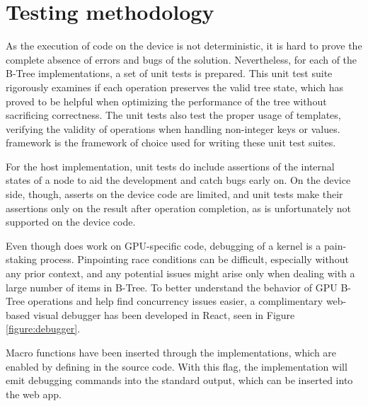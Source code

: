 \section{Testing methodology}

As the execution of code on the device is not deterministic, it is hard to prove the complete absence of errors and bugs of the solution. Nevertheless, for each of the B-Tree implementations, a set of unit tests is prepared. This unit test suite rigorously examines if each operation preserves the valid tree state, which has proved to be helpful when optimizing the performance of the tree without sacrificing correctness. The unit tests also test the proper usage of templates, verifying the validity of operations when handling non-integer keys or values.  framework \cite{gtest} is the framework of choice used for writing these unit test suites.

For the host implementation, unit tests do include assertions of the internal states of a node to aid the development and catch bugs early on. On the device side, though, asserts on the device code are limited, and unit tests make their assertions only on the result after operation completion, as  is unfortunately not supported on the device code.

Even though  does work on GPU-specific code, debugging of a kernel is a pain-staking process. Pinpointing race conditions can be difficult, especially without any prior context, and any potential issues might arise only when dealing with a large number of items in B-Tree. To better understand the behavior of GPU B-Tree operations and help find concurrency issues easier, a complimentary web-based visual debugger has been developed in React, seen in Figure \cref{figure:debugger}.

Macro functions have been inserted through the implementations, which are enabled by defining  in the source code. With this flag, the implementation will emit debugging commands into the standard output, which can be inserted into the web app.

